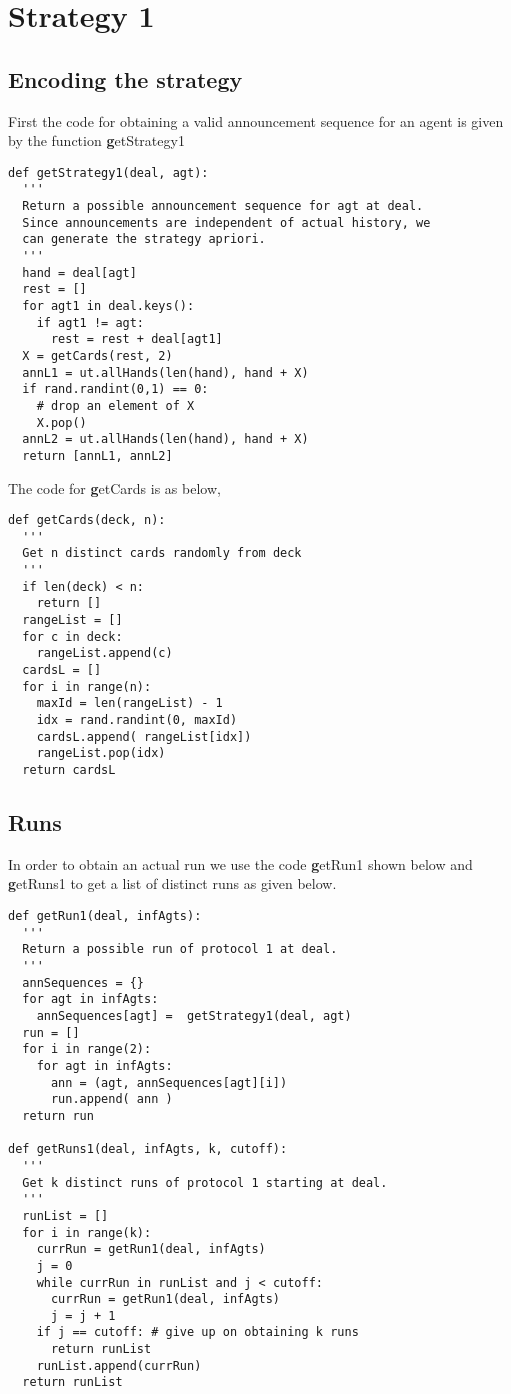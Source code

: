 \section{Strategy 1}

\subsection{Encoding the strategy}

First the code for obtaining a valid
announcement sequence for an agent is given by
the function {\textbf \textrm getStrategy1}

\begin{verbatim}
def getStrategy1(deal, agt):
  '''
  Return a possible announcement sequence for agt at deal.
  Since announcements are independent of actual history, we
  can generate the strategy apriori.
  '''
  hand = deal[agt]
  rest = []
  for agt1 in deal.keys():
    if agt1 != agt:
      rest = rest + deal[agt1]  
  X = getCards(rest, 2)
  annL1 = ut.allHands(len(hand), hand + X)
  if rand.randint(0,1) == 0: 
    # drop an element of X
    X.pop()
  annL2 = ut.allHands(len(hand), hand + X)
  return [annL1, annL2]
\end{verbatim}

The code for {\textbf getCards} is as below,

\begin{verbatim}
def getCards(deck, n):
  '''
  Get n distinct cards randomly from deck
  '''
  if len(deck) < n:
    return []
  rangeList = []
  for c in deck:
    rangeList.append(c)
  cardsL = []
  for i in range(n):
    maxId = len(rangeList) - 1
    idx = rand.randint(0, maxId)
    cardsL.append( rangeList[idx])
    rangeList.pop(idx)
  return cardsL
\end{verbatim}

\subsection{Runs}

In order to obtain an actual run we use the code
{\textbf \textrm getRun1} shown below and 
{\textbf \textrm getRuns1} to get a list of 
distinct runs as given below.

\begin{verbatim}
def getRun1(deal, infAgts):
  '''
  Return a possible run of protocol 1 at deal.
  '''
  annSequences = {}
  for agt in infAgts:
    annSequences[agt] =  getStrategy1(deal, agt)
  run = []
  for i in range(2):
    for agt in infAgts:
      ann = (agt, annSequences[agt][i])
      run.append( ann )
  return run

def getRuns1(deal, infAgts, k, cutoff):
  '''
  Get k distinct runs of protocol 1 starting at deal.
  '''
  runList = []
  for i in range(k):
    currRun = getRun1(deal, infAgts)
    j = 0
    while currRun in runList and j < cutoff:
      currRun = getRun1(deal, infAgts)      
      j = j + 1
    if j == cutoff: # give up on obtaining k runs
      return runList
    runList.append(currRun)
  return runList
\end{verbatim}

